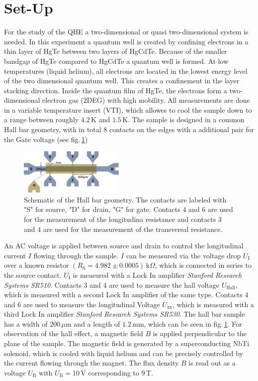 \section{Set-Up}
For the study of the QHE a two-dimensional or quasi two-dimensional system is needed.
In this experiment a quantum well is created by confining electrons in a thin layer of HgTe between
two layers of HgCdTe. Because of the smaller bandgap of HgTe compared to HgCdTe a quantum well is formed. 
At low temperatures (liquid helium), all electrons are located in the lowest energy level of the 
two dimensional quantum well. This creates a confinement in the layer stacking direction.
Inside the quantum film of HgTe, the electrons form a two-dimensional electron gas (2DEG) with high mobility.
All measurements are done in a variable temperature insert (VTI), which allowes to cool the sample down to a
range between roughly $4.2\,\text{K}$ and $1.5\,\text{K}$. The sample is designed in a common Hall bar geometry,
with in total $8$ contacts on the edges with a additional pair for the Gate voltage (see fig.\,\ref{fig:HallBar})
\begin{figure}[h]
    \centering
    \includegraphics[width=0.45\textwidth]{../Images/HallBar.png}
    \caption{Schematic of the Hall bar geometry. The contacts are labeled with "S" for source, "D" for drain,
    "G" for gate. Contacts $4$ and $6$ are used for the measurement of the longitudina resistance 
    and contacts $3$ and $4$ are used for the measurement of the transversal resistance.}
    \label{fig:HallBar}
\end{figure}
An AC voltage is applied between source and drain to control the longitudinal current $I$
flowing through the sample. $I$ can be measured via the voltage drop $U_\text{I}$ over a known resistor $(R_\text{S}=4.982\pm0.0005)\,\text{k}\Omega$, 
which is connected in series to the source contact. $U_\text{I}$ is measured with a Lock In amplifier 
\emph{Stanford Research Systems SR510}. Contacts $3$ and $4$ are used to measure the hall voltage $U_\text{Hall}$, which
is measured with a second Lock In amplifier of the same type. Contacts $4$ and $6$ are used to measure
the longitudinal Voltage $U_\text{xx}$, which is measured with a third Lock In amplifier \emph{Stanford Research Systems SR530}.
The hall bar sample has a width of $200\,\mu\text{m}$ and a length of $1.2\,\text{mm}$, which can be seen in fig.\,\ref{fig:HallBar}.
For observation of the hall effect, a magnetic field $B$ is applied perpendicular to the plane of the sample.
The magnetic field is generated by a superconducting NbTi solenoid, which is cooled with liquid helium and can
be precisely controlled by the current flowing through the magnet. The flux density $B$ is read out as a voltage
$U_\text{B}$ with $U_\text{B}=10\,\text{V}$ corresponding to $9\,\text{T}$.  